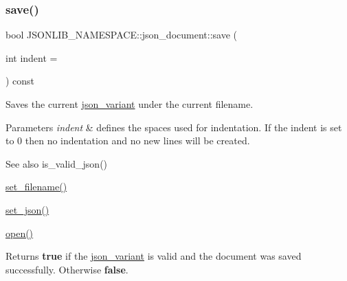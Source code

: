 \subsubsection{\texorpdfstring{save()}{save()}\hspace{0.1cm}{\footnotesize\ttfamily [3/3]}}
{\footnotesize\ttfamily bool J\+S\+O\+N\+L\+I\+B\+\_\+\+N\+A\+M\+E\+S\+P\+A\+C\+E\+::json\+\_\+document\+::save (\begin{DoxyParamCaption}\item[{int}]{indent = {} }\end{DoxyParamCaption}) const}



Saves the current \hyperlink{classJSONLIB__NAMESPACE_1_1json__variant}{json\+\_\+variant} under the current filename. 


\begin{DoxyParams}{Parameters}
{\em indent} & defines the spaces used for indentation. If the indent is set to 0 then no indentation and no new lines will be created. \\
\hline
\end{DoxyParams}
\begin{DoxySeeAlso}{See also}
is\+\_\+valid\+\_\+json() 

\hyperlink{classJSONLIB__NAMESPACE_1_1json__document_acc406344661e361c75ac7bc307057712}{set\+\_\+filename()} 

\hyperlink{classJSONLIB__NAMESPACE_1_1json__document_a5a72e4dc0b37b95c70baefad930b5b71}{set\+\_\+json()} 

\hyperlink{classJSONLIB__NAMESPACE_1_1json__document_a08e509059e628742f35716dddce2d740}{open()} 
\end{DoxySeeAlso}
\begin{DoxyReturn}{Returns}
{\bfseries true} if the \hyperlink{classJSONLIB__NAMESPACE_1_1json__variant}{json\+\_\+variant} is valid and the document was saved successfully. Otherwise {\bfseries false}. 
\end{DoxyReturn}
\mbox{\label{classJSONLIB__NAMESPACE_1_1json__document_acc406344661e361c75ac7bc307057712}} 
